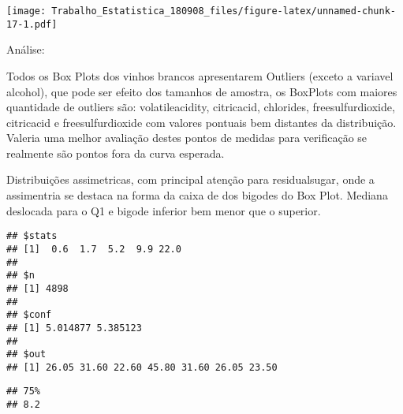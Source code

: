 \documentclass[]{article}
\newenvironment{Shaded}{\begin{snugshade}}{\end{snugshade}}
\newcommand{\KeywordTok}[1]{\textcolor[rgb]{0.13,0.29,0.53}{\textbf{#1}}}
\newcommand{\DataTypeTok}[1]{\textcolor[rgb]{0.13,0.29,0.53}{#1}}
\newcommand{\DecValTok}[1]{\textcolor[rgb]{0.00,0.00,0.81}{#1}}
\newcommand{\FloatTok}[1]{\textcolor[rgb]{0.00,0.00,0.81}{#1}}
\newcommand{\StringTok}[1]{\textcolor[rgb]{0.31,0.60,0.02}{#1}}
\newcommand{\OperatorTok}[1]{\textcolor[rgb]{0.81,0.36,0.00}{\textbf{#1}}}
\newcommand{\NormalTok}[1]{#1}
\begin{document}
\texttt{[image: Trabalho\_Estatistica\_180908\_files/figure-latex/unnamed-chunk-17-1.pdf]}

Análise:

Todos os Box Plots dos vinhos brancos apresentarem Outliers (exceto a
variavel alcohol), que pode ser efeito dos tamanhos de amostra, os
BoxPlots com maiores quantidade de outliers são: volatileacidity,
citricacid, chlorides, freesulfurdioxide, citricacid e freesulfurdioxide
com valores pontuais bem distantes da distribuição. Valeria uma melhor
avaliação destes pontos de medidas para verificação se realmente são
pontos fora da curva esperada.

Distribuições assimetricas, com principal atenção para residualsugar,
onde a assimentria se destaca na forma da caixa de dos bigodes do Box
Plot. Mediana deslocada para o Q1 e bigode inferior bem menor que o
superior.

\begin{Shaded}
\end{Shaded}

\begin{verbatim}
## $stats
## [1]  0.6  1.7  5.2  9.9 22.0
## 
## $n
## [1] 4898
## 
## $conf
## [1] 5.014877 5.385123
## 
## $out
## [1] 26.05 31.60 22.60 45.80 31.60 26.05 23.50
\end{verbatim}

\begin{Shaded}
\end{Shaded}

\begin{verbatim}
## 75% 
## 8.2
\end{verbatim}

\begin{Shaded}
\end{Shaded}
\end{document}
